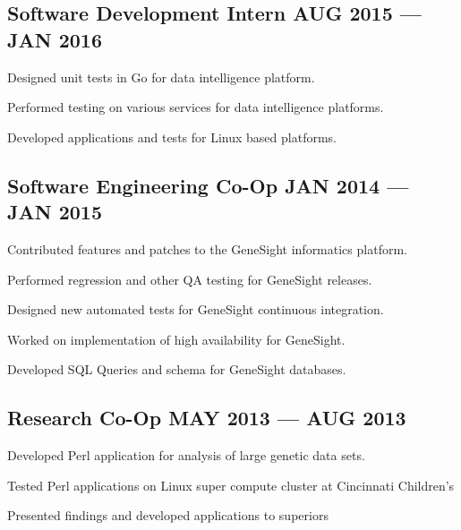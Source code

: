 \subsection{{Software Development Intern \hfill AUG 2015 --- JAN 2016}}
\begin{zitemize}
\item Designed unit tests in Go for data intelligence platform.
\item Performed testing on various services for data intelligence platforms.
\item Developed applications and tests for Linux based platforms.
\end{zitemize}

\subsection{{Software Engineering Co-Op \hfill JAN 2014 --- JAN 2015}}
\begin{zitemize}
\item Contributed features and patches to the GeneSight informatics platform.
\item Performed regression and other QA testing for GeneSight releases.
\item Designed new automated tests for GeneSight continuous integration.
\item Worked on implementation of high availability for GeneSight.
\item Developed SQL Queries and schema for GeneSight databases.
\end{zitemize}

\subsection{{Research Co-Op \hfill MAY 2013 --- AUG 2013}}
\begin{zitemize}
\item Developed Perl application for analysis of large genetic data sets.
\item Tested Perl applications on Linux super compute cluster at Cincinnati Children's
\item Presented findings and developed applications to superiors
\end{zitemize}
